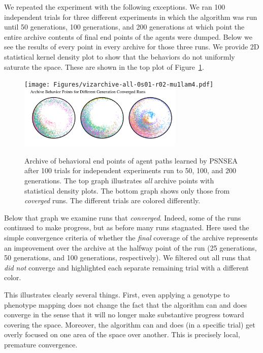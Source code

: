 \documentclass[twoside]{article}
\begin{document}
{We repeated the experiment with the following exceptions. We ran 100 independent trials for three different experiments in which the algorithm was run until 50 generations, 100 generations, and 200 generations at which point the entire archive contents of final end points of the agents were dumped.  Below we see the results of every point in every archive for those three runs.  We provide 2D statistical kernel density plot to show that the behaviors do not uniformly saturate the space.  These are shown in the top plot of Figure~\ref{fig:vizarchive:all}.
%
\begin{figure}[h]
  \begin{center}
    \texttt{[image: Figures/vizarchive-all-0s01-r02-mu1lam4.pdf]}\\
    \includegraphics[width=0.7\textwidth]{Figures/vizarchive-conv-s01-r02-mu1lam4.pdf}
  \end{center}
  \vspace*{-1em}
  \caption{\label{fig:vizarchive:all} Archive of behavioral end points of agent paths learned by PSNSEA after 100 trials for independent experiments run to 50, 100, and 200 generations.  The top graph illustrates \emph{all} archive points with statistical density plots.  The bottom graph shows only those from \emph{coverged} runs.  The different trials are colored differently.}
\end{figure}

Below that graph we examine runs that \emph{converged}.  Indeed, some of the runs continued to make progress, but as before many runs stagnated.  Here used the simple convergence criteria of whether the \emph{final} coverage of the archive represents an improvement over the archive at the halfway point of the run (25 generations, 50 generations, and 100 generations, respectively).  We filtered out all runs that \emph{did not} converge and highlighted each separate remaining trial with a different color.

This illustrates clearly several things.  First, even applying a genotype to phenotype mapping does not change the fact that the algorithm can and does converge in the sense that it will no longer make substantive progress toward covering the space.  Moreover, the algorithm can and does (in a specific trial) get overly focused on one area of the space over another.  This is precisely local, premature convergence.
} %
\end{document}
